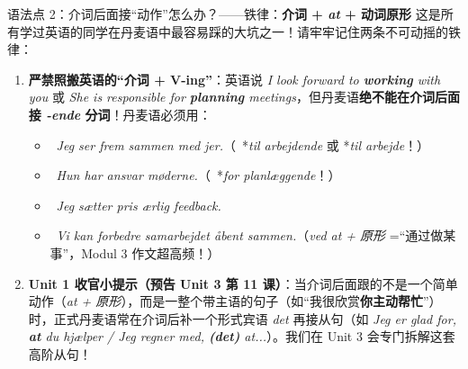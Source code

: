 \begin{grammatikbox}{语法点 2：介词后面接“动作”怎么办？——铁律：\textbf{介词 + \textit{at} + 动词原形}}
这是所有学过英语的同学在丹麦语中最容易踩的大坑之一！请牢牢记住两条不可动摇的铁律：
\begin{enumerate}
  \item \textbf{严禁照搬英语的“介词 + V-ing”}：英语说 \textit{I look forward to \textbf{working} with you} 或 \textit{She is responsible for \textbf{planning} meetings}，但丹麦语\textbf{绝不能在介词后面接 \textit{-ende} 分词}！丹麦语必须用\textbf{}：
    \begin{itemize}
      \item {}\ \textit{Jeg ser frem  sammen med jer.}（\ *\textit{til arbejdende} 或 *\textit{til arbejde}！）
      \item {}\ \textit{Hun har ansvar  møderne.}（\ *\textit{for planlæggende}！）
      \item {}\ \textit{Jeg sætter pris  ærlig feedback.}
      \item {}\ \textit{Vi kan forbedre samarbejdet  åbent sammen.}（\textit{ved at + 原形} =“通过做某事”，Modul 3 作文超高频！）
    \end{itemize}
  \item \textbf{Unit 1 收官小提示（预告 Unit 3 第 11 课）}：当介词后面跟的不是一个简单动作（\textit{at + 原形}），而是一整个带主语的句子（如“我很欣赏\textbf{你主动帮忙}”）时，正式丹麦语常在介词后补一个形式宾语 \textit{det} 再接从句（如 \textit{Jeg er glad for, \textbf{at} du hjælper / Jeg regner med, \textbf{(det)} at...}）。我们在 Unit 3 会专门拆解这套高阶从句！
\end{enumerate}
\end{grammatikbox}


